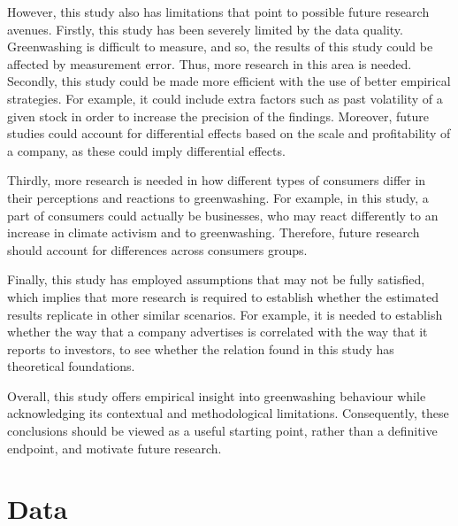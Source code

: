 \documentclass[12pt]{article}
\begin{document}
However, this study also has limitations that point to possible future research avenues. Firstly, this study has been severely limited by the data quality. Greenwashing is difficult to measure, and so, the results of this study could be affected by measurement error. Thus, more research in this area is needed. Secondly, this study could be made more efficient with the use of better empirical strategies. For example, it could include extra factors such as past volatility of a given stock in order to increase the precision of the findings. Moreover, future studies could account for differential effects based on the scale and profitability of a company, as these could imply differential effects. 

Thirdly, more research is needed in how different types of consumers differ in their perceptions and reactions to greenwashing. For example, in this study, a part of consumers could actually be businesses, who may react differently to an increase in climate activism and to greenwashing. Therefore, future research should account for differences across consumers groups. 

Finally, this study has employed assumptions that may not be fully satisfied, which implies that more research is required to establish whether the estimated results replicate in other similar scenarios. For example, it is needed to establish whether the way that a company advertises is correlated with the way that it reports to investors, to see whether the relation found in this study has theoretical foundations. 

Overall, this study offers empirical insight into greenwashing behaviour while acknowledging its contextual and methodological limitations. Consequently, these conclusions should be viewed as a useful starting point, rather than a definitive endpoint, and motivate future research.



\pagebreak
\printbibliography{}
\pagebreak
\appendix

\section{Data}\label{app:data}
\end{document}
